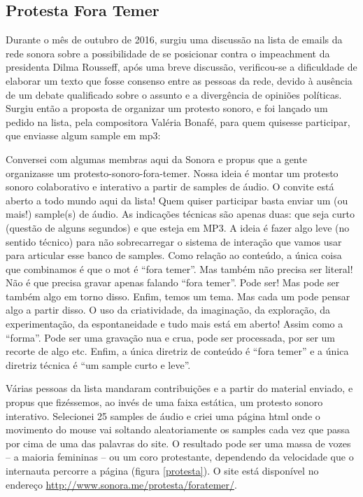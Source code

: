 \subsection{Protesta Fora Temer}
Durante o mês de outubro de 2016, surgiu uma discussão na lista de emails da rede sonora sobre a possibilidade de se posicionar contra o impeachment da presidenta Dilma Rousseff, após uma breve discussão, verificou-se a dificuldade de elaborar um texto que fosse consenso entre as pessoas da rede, devido à ausência de um debate qualificado sobre o assunto e a divergência de opiniões políticas. 
Surgiu então a proposta de organizar um protesto sonoro, e foi lançado um pedido na lista, pela compositora Valéria Bonafé, para quem quisesse participar, que enviasse algum sample em mp3: 
\begin{citacao}

Conversei com algumas membras aqui da Sonora e propus que a gente organizasse um protesto-sonoro-fora-temer. Nossa ideia é montar um protesto sonoro colaborativo e interativo a partir de samples de áudio. O convite está aberto a todo mundo aqui da lista! Quem quiser participar basta enviar um (ou mais!) sample(s) de áudio. As indicações técnicas são apenas duas: que seja curto (questão de alguns segundos) e que esteja em MP3. A ideia é fazer algo leve (no sentido técnico) para não sobrecarregar o sistema de interação que vamos usar para articular esse banco de samples. Como relação ao conteúdo, a única coisa que combinamos é que o mot é “fora temer”. Mas também não precisa ser literal! Não é que precisa gravar apenas falando “fora temer”. Pode ser! Mas pode ser também algo em torno disso. Enfim, temos um tema. Mas cada um pode pensar algo a partir disso. O uso da criatividade, da imaginação, da exploração, da experimentação, da espontaneidade e tudo mais está em aberto! Assim como a “forma”. Pode ser uma gravação nua e crua, pode ser processada, por ser um recorte de algo etc. Enfim, a única diretriz de conteúdo é “fora temer” e a única diretriz técnica é “um sample curto e leve”.
\end{citacao}
Várias pessoas da lista mandaram contribuições e a partir do material enviado, e propus que fizéssemos, ao invés de uma faixa estática, um protesto sonoro interativo. Selecionei 25 samples de áudio e criei uma página html onde o movimento do mouse vai soltando aleatoriamente os samples cada vez que passa por cima de uma das palavras do site. O resultado pode ser uma massa de vozes – a maioria femininas – ou um coro protestante, dependendo da velocidade que o internauta percorre a página (figura \ref{protesta}). O site está disponível no endereço \url{http://www.sonora.me/protesta/foratemer/}. 

